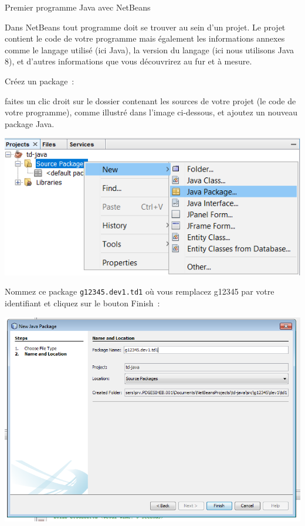 \documentclass[a4paper,11pt]{article}
\begin{document}
\begin{Tutoriel}{Premier programme Java avec NetBeans}
\begin{steps}
			Dans NetBeans tout programme doit se trouver au sein d'un projet.
			Le projet contient le code de votre programme mais également les 
			informations annexes comme le langage utilisé (ici Java), 
			la version du langage (ici nous utilisons Java 8), 
			et d'autres informations que vous découvrirez au fur et à mesure.



		\item Créez un package~: 
		
			faites un clic droit sur le dossier contenant les sources de votre projet 
			(le code de votre programme), comme illustré dans l'image ci-dessous, 
			et ajoutez un nouveau package Java.
		
			\bigskip
			\begin{center}
				\includegraphics[width=.9\textwidth]{images/nb_newproject_package}
			\end{center}

			Nommez ce package \texttt{g12345.dev1.td1} où vous remplacez g12345 par votre identifiant et cliquez sur le bouton \og Finish\fg~:
			
			\bigskip
			\begin{center}
				\includegraphics[width=.9\textwidth]{images/nb_newproject_package2}
			\end{center}
			

\end{steps}
\end{Tutoriel}
\end{document}
